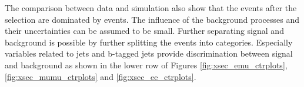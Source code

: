 The comparison between data and simulation also show that the events after the selection are dominated by \ttbar events. The influence of the background processes and their uncertainties can be assumed to be small.
Further separating signal and background is possible by further splitting the events into categories. Especially variables related to jets and b-tagged jets provide discrimination between signal and background as shown in the lower row of Figures 
\ref{fig:xsec_emu_ctrplots},\ref{fig:xsec_mumu_ctrplots} and \ref{fig:xsec_ee_ctrplots}.


\begin{figure}[htbp!]
  \begin{center}

\end{center}
\end{figure}
